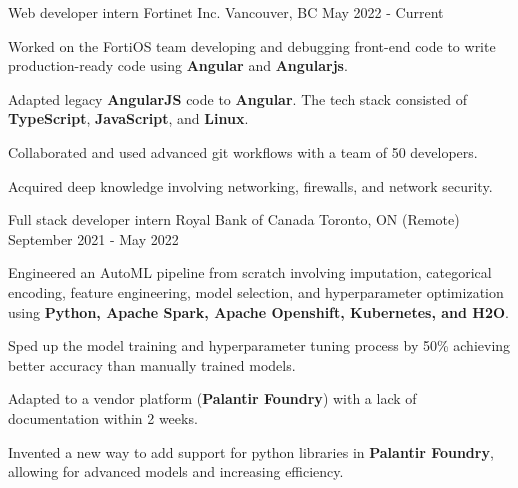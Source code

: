 

\begin{cventries}

	\cventry
	{Web developer intern} %
	{Fortinet Inc.} %
	{Vancouver, BC} %
	{May 2022 - Current} %
	{
		\begin{cvitems} %
			\item {Worked on the FortiOS team developing and debugging front-end code to write production-ready code using \textbf{Angular} and \textbf{Angularjs}.}
			\item {Adapted legacy \textbf{AngularJS} code to \textbf{Angular}. The tech stack consisted of \textbf{TypeScript}, \textbf{JavaScript}, and \textbf{Linux}.}
			\item {Collaborated and used advanced git workflows with a team of 50 developers.}
			\item {Acquired deep knowledge involving networking, firewalls, and network security.}
		\end{cvitems}
	}

	\cventry
	{Full stack developer intern} %
	{Royal Bank of Canada} %
	{Toronto, ON (Remote)} %
	{September 2021 - May 2022} %
	{
		\begin{cvitems} %
			\item {Engineered an AutoML pipeline from scratch involving imputation, categorical encoding, feature engineering, model selection, and hyperparameter optimization using \textbf{Python, Apache Spark, Apache Openshift, Kubernetes, and H2O}.}
			\item {Sped up the model training and hyperparameter tuning process by 50\% achieving better accuracy than manually trained models.}
			\item {Adapted to a vendor platform (\textbf{Palantir Foundry}) with a lack of documentation within 2 weeks.}
			\item {Invented a new way to add support for python libraries in \textbf{Palantir Foundry}, allowing for advanced models and increasing efficiency.}
		\end{cvitems}
	}


\end{cventries}
